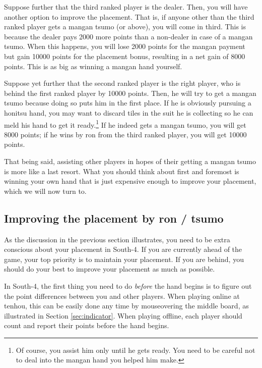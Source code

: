 \bigskip
Suppose further that the third ranked player is the dealer. Then, you will have another option to improve the placement. That is, if anyone other than the third ranked player gets a {\jap mangan tsumo} (or above), you will come in third. This is because the dealer pays 2000 more points than a non-dealer in case of a {\jap mangan tsumo}. When this happens, you will lose 2000 points for the {\jap mangan} payment but gain 10000 points for the placement bonus, resulting in a net gain of 8000 points. This is as big as winning a {\jap mangan} hand yourself.

\bigskip
Suppose yet further that the second ranked player is the right player, who is behind the first ranked player by 10000 points. Then, he will try to get a {\jap mangan tsumo} because doing so puts him in the first place. If he is obviously pursuing a {\jap honitsu} hand, you may want to discard tiles in the suit he is collecting so he can meld his hand to get it ready.\footnote{Of course, you assist him only until he gets ready. You need to be careful not to deal into the {\jap mangan} hand you helped him make.} If he indeed gets a {\jap mangan tsumo}, you will get 8000 points; if he wins by {\jap ron} from the third ranked player, you will get 10000 points. 

\bigskip
That being said, assisting other players in hopes of their getting a {\jap mangan tsumo} is more like a last resort. What you should think about first and foremost is winning your own hand that is just expensive enough to improve your placement, which we will now turn to.

\subsection*{Improving the placement by {\jap ron} / {\jap tsumo}}
As the discussion in the previous section illustrates, you need to be extra conscious about your placement in South-4. If you are currently ahead of the game, your top priority is to maintain your placement. If you are behind, you should do your best to improve your placement as much as possible. 

\bigskip
In South-4, the first thing you need to do \emph{before} the hand begins is to figure out the point differences between you and other players. When playing online at {\jap tenhou}, this can be easily done any time by mouseovering the middle board, as illustrated in Section \ref{sec:indicator}. When playing offline, each player should count and report their points before the hand begins. 

